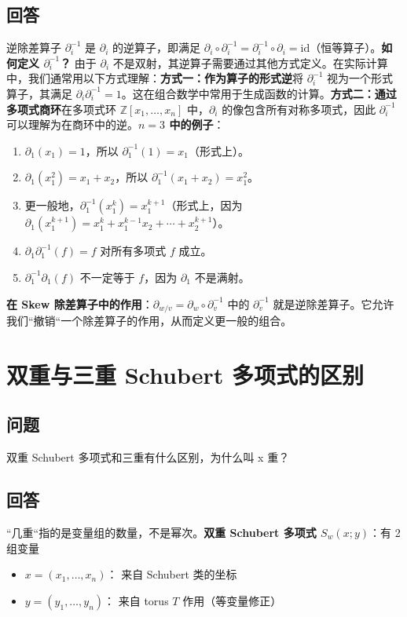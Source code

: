 \subsection{回答}
逆除差算子 $\partial_i^{-1}$ 是 $\partial_i$ 的逆算子，即满足 $\partial_i \circ \partial_i^{-1} = \partial_i^{-1} \circ \partial_i = \text{id}$（恒等算子）。\textbf{如何定义 $\partial_i^{-1}$？} 由于 $\partial_i$ 不是双射，其逆算子需要通过其他方式定义。在实际计算中，我们通常用以下方式理解：\textbf{方式一：作为算子的形式逆}将 $\partial_i^{-1}$ 视为一个形式算子，其满足 $\partial_i \partial_i^{-1} = 1$。这在组合数学中常用于生成函数的计算。\textbf{方式二：通过多项式商环}在多项式环 $\mathbb{Z}[x_1, \ldots, x_n]$ 中，$\partial_i$ 的像包含所有对称多项式，因此 $\partial_i^{-1}$ 可以理解为在商环中的逆。\textbf{$n=3$ 中的例子}：
\begin{enumerate}
\item $\partial_1(x_1) = 1$，所以 $\partial_1^{-1}(1) = x_1$（形式上）。\item $\partial_1(x_1^2) = x_1 + x_2$，所以 $\partial_1^{-1}(x_1 + x_2) = x_1^2$。\item 更一般地，$\partial_1^{-1}(x_1^k) = x_1^{k+1}$（形式上，因为 $\partial_1(x_1^{k+1}) = x_1^k + x_1^{k-1}x_2 + \cdots + x_2^{k+1}$）。\item $\partial_1 \partial_1^{-1}(f) = f$ 对所有多项式 $f$ 成立。\item $\partial_1^{-1} \partial_1(f)$ 不一定等于 $f$，因为 $\partial_1$ 不是满射。
\end{enumerate}

\textbf{在 Skew 除差算子中的作用}：$\partial_{w/v} = \partial_w \circ \partial_v^{-1}$ 中的 $\partial_v^{-1}$ 就是逆除差算子。它允许我们``撤销``一个除差算子的作用，从而定义更一般的组合。
\section{双重与三重 Schubert 多项式的区别}\label{sec:DoubleVsTriple}
\subsection{问题}
双重 Schubert 多项式和三重有什么区别，为什么叫 x 重？
\subsection{回答}
``几重``指的是变量组的数量，不是幂次。\textbf{双重 Schubert 多项式 $S_w(x; y)$}：有 2 组变量
\begin{itemize}
\item $x = (x_1, \ldots, x_n)$：
来自 Schubert 类的坐标\item $y = (y_1, \ldots, y_n)$：
来自 torus $T$ 作用（等变量修正）
\end{itemize}

